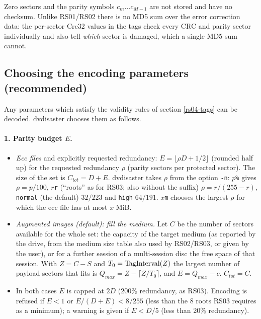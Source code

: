 Zero sectors and the parity symbols $c_m \ldots c_{M-1}$ are not stored and
have no checksum. Unlike RS01/RS02 there is no MD5 sum over the
error correction data: the per-sector Crc32 values in the tags check every
CRC and parity sector individually and also tell {\em which} sector is
damaged, which a single MD5 sum cannot.

\subsection{Choosing the encoding parameters (recommended)}
\label{rs04-params}

Any parameters which satisfy the validity rules of section \ref{rs04-tags}
can be decoded. dvdisaster chooses them as follows.

\paragraph{1. Parity budget $E$.}
\begin{itemize}
\item {\em Ecc files} and explicitly requested redundancy:
  $E = \lfloor \rho D + 1/2 \rfloor$ (rounded half up) for the requested
  redundancy $\rho$ (parity sectors per protected sector). The size of the
  set is $C_{tot} = D + E$. dvdisaster takes $\rho$ from the option
  {\tt -n}: $p${\tt \%} gives $\rho = p/100$, $r${\tt r} (``roots'' as for
  RS03; also without the suffix) $\rho = r/(255-r)$, {\tt normal} (the
  default) $32/223$ and {\tt high} $64/191$. $x${\tt m} chooses the
  largest $\rho$ for which the ecc file has at most $x$ MiB.
\item {\em Augmented images (default): fill the medium.} Let $C$ be the
  number of sectors available for the whole set: the capacity of the target
  medium (as reported by the drive, from the medium size table also used by
  RS02/RS03, or given by the user), or for a further session of a
  multi-session disc the free space of that session. With $Z = C - S$ and
  $T_0 = {\rm TagInterval}(Z)$ the largest number of payload sectors that
  fits is $Q_{max} = Z - \lceil Z / T_0 \rceil$, and
  $E = Q_{max} - c$. $C_{tot} = C$.
\item In both cases $E$ is capped at $2D$ (200\% redundancy, as RS03).
  Encoding is refused if $E < 1$ or $E/(D+E) < 8/255$ (less than the 8
  roots RS03 requires as a minimum); a warning is given if $E < D/5$
  (less than 20\% redundancy).
\end{itemize}

